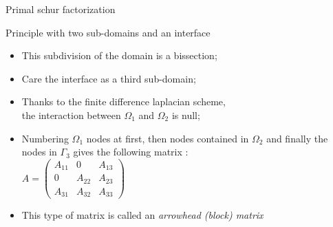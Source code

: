 \documentclass[compress,10pt,aspectratio=169]{beamer}
\begin{document}
\begin{frame}{Primal schur factorization}
  \scriptsize
  \begin{block}{Principle with two sub-domains and an interface}
    \begin{multicols}{2}
    \begin{figure}[h]
    \end{figure}

    \begin{itemize}
      \item This subdivision of the domain is a bissection;
      \item Care the interface as a third sub-domain;
      \item Thanks to the finite difference laplacian scheme,\\
      the interaction between $\Omega_{1}$ and $\Omega_{2}$ is null;
      \item Numbering $\Omega_{1}$ nodes at first, then nodes contained in
      $\Omega_{2}$ and finally the nodes in $\Gamma_{3}$ gives the following matrix :\\
      $A = \left(\begin{array}{ccc}
          A_{11} & 0 & A_{13} \\
            0    & A_{22} & A_{23} \\
            A_{31} & A_{32} & A_{33}
      \end{array}\right)$
      \item This type of matrix is called an \textsl{arrowhead (block) matrix}
    \end{itemize}
  \end{multicols}
  \end{block}
\end{frame}
\end{document}
